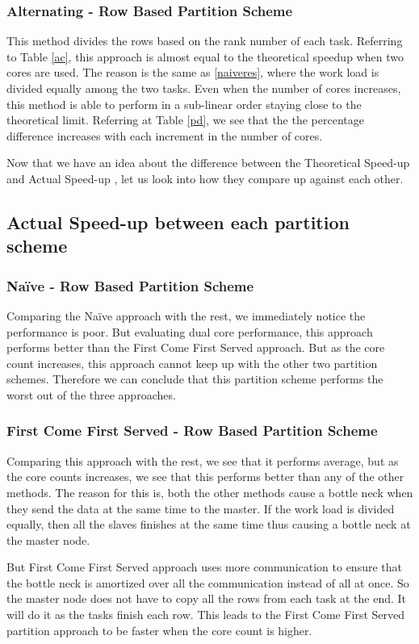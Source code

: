 \documentclass[conference]{IEEEtran}
\begin{document}
	\subsubsection{Alternating - Row Based Partition Scheme}
	This method divides the rows based on the rank number of each task. Referring to Table \ref{ac}, this approach is almost equal to the theoretical speedup when two cores are used. The reason is the same as \ref{naiveres}, where the work load is divided equally among the two tasks. Even when the number of cores increases, this method is able to perform in a sub-linear order staying close to the theoretical limit. Referring at Table \ref{pd}, we see that the the percentage difference increases with each increment in the number of cores.
	
	Now that we have an idea about the difference between the Theoretical Speed-up and Actual Speed-up , let us look into how they compare up against each other.
	
	\subsection{Actual Speed-up between each partition scheme}
	
		\subsubsection{Naïve - Row Based Partition Scheme }
		Comparing the Naïve approach with the rest, we immediately notice the performance is poor. But evaluating dual core performance, this approach performs better than the First Come First Served approach. But as the core count increases, this approach cannot keep up with the other two partition schemes. Therefore we can conclude that this partition scheme performs the worst out of the three approaches.
	\subsubsection{First Come First Served - Row Based Partition Scheme}
	\label{fcfsex}
		Comparing this approach with the rest, we see that it performs average, but as the core counts increases, we see that this performs better than any of the other methods. The reason for this is, both the other methods cause a bottle neck when they send the data at the same time to the master. If the work load is divided equally, then all the slaves finishes at the same time thus causing a bottle neck at the master node. 
		
		But First Come First Served approach uses more communication to ensure that the bottle neck is amortized over all the communication instead of all at once. So the master node does not have to copy all the rows from each task at the end. It will do it as the tasks finish each row. This leads to the First Come First Served partition approach to be faster when the core count is higher.
	
\end{document}
